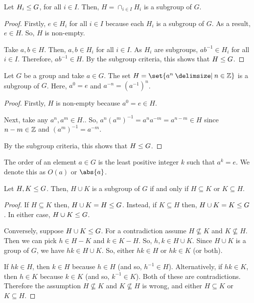 \documentclass[11pt]{penrose}
\begin{document}
\begin{nthm}
    Let $H_i \mathrel{\leq} G$, for all $i \in I$. Then, $H = \cap_{i \in I} H_i$ is a subgroup of $G$.
\end{nthm}
\begin{proof}
    Firstly, $e \in H_i$ for all $i \in I$ because each $H_i$ is a subgroup of $G$. As a result, $e \in H$. So, $H$ is non-empty.

    Take $a, b \in H$. Then, $a, b \in H_i$ for all $i \in I$. As $H_i$ are subgroups, $ab^{-1} \in H_i$ for all $i \in I$. Therefore, $ab^{-1} \in H$. By the subgroup criteria, this shows that $H \mathrel{\leq} G$.
\end{proof}

\begin{nthm}
    Let $G$ be a group and take $a \in G$. The set $H = \set{a^n \st n \in \Z}$ is a subgroup of $G$. Here, $a^0 = e$ and $a^{-n} = \left(a^{-1}\right)^{n}$.
\end{nthm}
\begin{proof}
    Firstly, $H$ is non-empty because $a^0 = e \in H$.

    Next, take any $a^{n}, a^{m} \in H$.. So, $a^{n} (a^{m})^{-1} = a^{n} a^{-m} = a^{n - m} \in H$ since $n - m \in \mathbb{Z}$ and $(a^{m})^{-1} = a^{-m}$.

    By the subgroup criteria, this shows that $H \mathrel{\leq} G$.
\end{proof}

\begin{ndfn}
    The order of an element $a \in G$ is the least positive integer $k$ such that $a^k = e$. We denote this as $O(a)$ or $\abs{a}$.
\end{ndfn}

\begin{nthm}
    Let $H, K \mathrel{\leq} G$. Then, $H \cup K$ is a subgroup of $G$ if and only if $H \subseteq K$ or $K \subseteq H$.
\end{nthm}
\begin{proof}
    If $H \subseteq K$ then, $H \cup K = H \mathrel{\leq} G$. Instead, if $K \subseteq H$ then, $H \cup K = K \mathrel{\leq} G$. In either case, $H \cup K \mathrel{\leq} G$.

    Conversely, suppose $H \cup K \mathrel{\leq} G$. For a contradiction assume $H \nsubseteq K$ and $K \nsubseteq H$. Then we can pick $h \in H - K$ and $k \in K - H$. So, $h, k \in H \cup K$. Since $H \cup K$ is a group of $G$, we have $hk \in H \cup K$. So, either $hk \in H$ or $hk \in K$ (or both).

    If $hk \in H$, then $k \in H$ because $h \in H$ (and so, $h^{-1} \in H$). Alternatively, if $hk \in K$, then $h \in K$ because $k \in K$ (and so, $k^{-1} \in K$). Both of these are contradictions. Therefore the assumption $H \nsubseteq K$ and $K \nsubseteq H$ is wrong, and either $H \subseteq K$ or $K \subseteq H$.
\end{proof}
\end{document}
